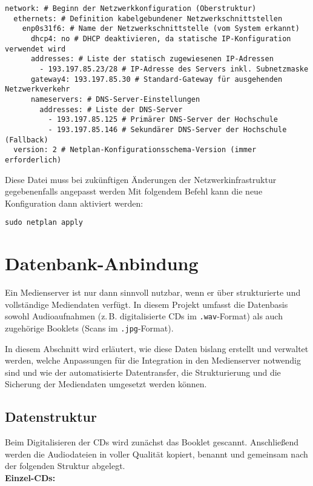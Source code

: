 \documentclass[12pt,a4paper]{report}
\begin{document}
\begin{verbatim}
network: # Beginn der Netzwerkkonfiguration (Oberstruktur)
  ethernets: # Definition kabelgebundener Netzwerkschnittstellen
    enp0s31f6: # Name der Netzwerkschnittstelle (vom System erkannt)
      dhcp4: no # DHCP deaktivieren, da statische IP-Konfiguration verwendet wird
      addresses: # Liste der statisch zugewiesenen IP-Adressen
        - 193.197.85.23/28 # IP-Adresse des Servers inkl. Subnetzmaske
      gateway4: 193.197.85.30 # Standard-Gateway für ausgehenden Netzwerkverkehr
      nameservers: # DNS-Server-Einstellungen
        addresses: # Liste der DNS-Server
          - 193.197.85.125 # Primärer DNS-Server der Hochschule
          - 193.197.85.146 # Sekundärer DNS-Server der Hochschule (Fallback)
  version: 2 # Netplan-Konfigurationsschema-Version (immer erforderlich)
\end{verbatim}

Diese Datei muss bei zukünftigen Änderungen der Netzwerkinfrastruktur gegebenenfalls angepasst werden
Mit folgendem Befehl kann die neue Konfiguration dann aktiviert werden:

\begin{verbatim}
sudo netplan apply
\end{verbatim}

\section{Datenbank-Anbindung}
Ein Medienserver ist nur dann sinnvoll nutzbar, wenn er über strukturierte und vollständige Mediendaten verfügt. 
In diesem Projekt umfasst die Datenbasis sowohl Audioaufnahmen (z.\,B. digitalisierte CDs im \texttt{.wav}-Format) 
als auch zugehörige Booklets (Scans im \texttt{.jpg}-Format).  

In diesem Abschnitt wird erläutert, wie diese Daten bislang erstellt und verwaltet werden, 
welche Anpassungen für die Integration in den Medienserver notwendig sind und 
wie der automatisierte Datentransfer, die Strukturierung und die Sicherung der Mediendaten umgesetzt werden können.  
 
  \subsection{Datenstruktur}
  Beim Digitalisieren der CDs wird zunächst das Booklet gescannt. 
  Anschließend werden die Audiodateien in voller Qualität kopiert, benannt und gemeinsam nach der folgenden Struktur abgelegt.
  \\
  \newline
  \textbf{Einzel-CDs:}
\end{document}
